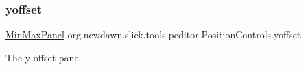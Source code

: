 \subsubsection{\texorpdfstring{yoffset}{yoffset}}
{\footnotesize\ttfamily \mbox{\hyperlink{classorg_1_1newdawn_1_1slick_1_1tools_1_1peditor_1_1_min_max_panel}{Min\+Max\+Panel}} org.\+newdawn.\+slick.\+tools.\+peditor.\+Position\+Controls.\+yoffset\hspace{0.3cm}{\ttfamily [private]}}

The y offset panel 